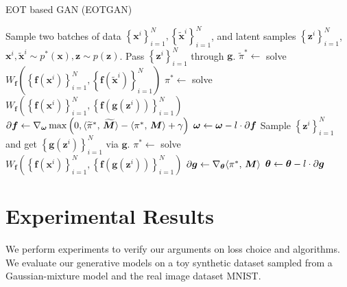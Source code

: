 \begin{algorithm}[!t]
  \caption{EOT based GAN (EOTGAN)}\label{algo-eWGAN}
  \begin{algorithmic}[1]
    \STATE Sample two batches of data $ \left\{ \bm{x}^{i}
    \right\}_{i=1}^{N}, \left\{ \tilde{\bm{x}}^{i} \right\}_{i=1}^{N}  $,
    and latent samples $\left\{ \bm{z}^{i} \right\}_{i=1}^{N} $,
    $\bm{x}^{i},\tilde{\bm{x}}^{i} \sim p^{\ast}(\bm{x}), \bm{z}\sim p(\bm{z})$.
    \STATE Pass
    $\left\{ \bm{z}^{i} \right\}_{i=1}^{N}$ through $\bm{g}$.
    \STATE $\widetilde{\pi}^{\ast} \gets$ solve $ W_{\bm{f}}\left( \left\{ \bm{f}(\bm{x}^{i})
      \right\}_{i=1}^{N} , \left\{ \bm{f}(\tilde{\bm{x}}^{i})
      \right\}_{i=1}^{N}\right)$
    \STATE ${\pi}^{\ast} \gets$ solve $W_{\bm{f}}\left( \left\{ \bm{f}(\bm{x}^{i})
      \right\}_{i=1}^{N}, \left\{ \bm{f}(\bm{g}(\bm{z}^i))
      \right\}_{i=1}^{N} \right)$
    \STATE $\partial{\bm{f}} \gets \nabla_{\bm{\omega}} \max\left(0,  \langle \widetilde{\pi}^{\ast},\,\widetilde{\bm{M}}\rangle-\langle {\pi^{\ast}},\,\bm{M}\rangle+ \gamma\right)$
    \STATE $\bm{\omega} \gets \bm{\omega} - l \cdot \partial{\bm{f}}$
    \STATE Sample $\left\{ \bm{z}^{i} \right\}_{i=1}^{N}$
    and get $ \left\{ \bm{g}(\bm{z}^i)\right\}_{i=1}^{N}$ via $\bm{g}$.
    \STATE $\pi^{\ast} \gets$ solve $W_{\bm{f}}\left( \left\{ \bm{f}(\bm{x}^{i})
      \right\}_{i=1}^{N}, \left\{ \bm{f}(\bm{g}(\bm{z}^{i}))
      \right\}_{i=1}^{N} \right)$
    \STATE $\partial{\bm{g}} \gets \nabla_{\bm{\theta}} \langle \pi^{\ast},\,\bm{M}\rangle$
    \STATE $\bm{\theta} \gets \bm{\theta} -l \cdot \partial{\bm{g}}$
    \ENDWHILE
  \end{algorithmic}
\end{algorithm}



\section{Experimental Results}
We perform experiments to verify our arguments on loss choice and algorithms. We evaluate our
generative models on a toy synthetic dataset sampled from a Gaussian-mixture model and the real image dataset MNIST.

